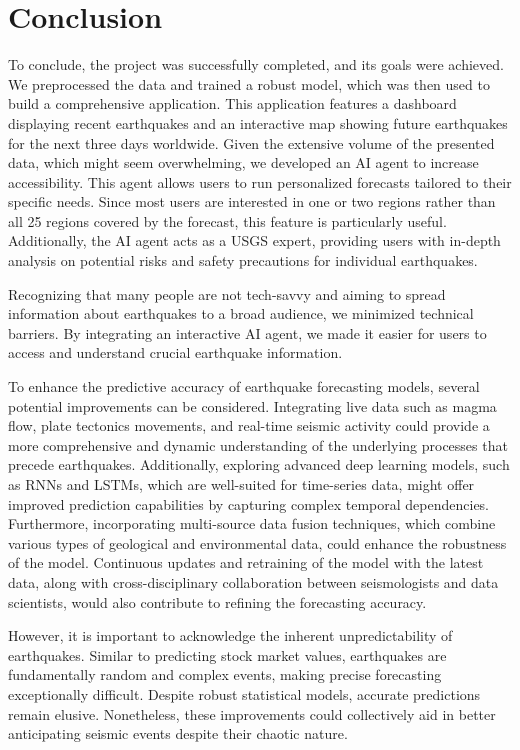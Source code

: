 \chapter{Conclusion}\label{ch:conclusion}
To conclude, the project was successfully completed, and its goals were achieved.
We preprocessed the data and trained a robust model, which was then used to build a
comprehensive application. This application features a dashboard displaying recent
earthquakes and an interactive map showing future earthquakes for the next three days
worldwide. Given the extensive volume of the presented data, which might seem overwhelming,
we developed an AI agent to increase accessibility. This agent allows users to run
personalized forecasts tailored to their specific needs. Since most users are
interested in one or two regions rather than all 25 regions covered by the forecast,
this feature is particularly useful. Additionally, the AI agent acts as a \ac{USGS} expert,
providing users with in-depth analysis on potential risks and safety precautions for individual earthquakes.

Recognizing that many people are not tech-savvy and aiming to spread information
about earthquakes to a broad audience, we minimized technical barriers. By integrating
an interactive AI agent, we made it easier for users to access and understand crucial
earthquake information.

To enhance the predictive accuracy of earthquake forecasting models, several potential
improvements can be considered. Integrating live data such as magma flow, plate tectonics
movements, and real-time seismic activity could provide a more comprehensive and dynamic
understanding of the underlying processes that precede earthquakes. Additionally, exploring
advanced deep learning models, such as \ac{RNNs} and \ac{LSTM}s, which are well-suited for time-series
data, might offer improved prediction capabilities by capturing complex temporal dependencies.
Furthermore, incorporating multi-source data fusion techniques, which combine various types of
geological and environmental data, could enhance the robustness of the model. Continuous
updates and retraining of the model with the latest data, along with cross-disciplinary
collaboration between seismologists and data scientists, would also contribute to refining
the forecasting accuracy.

However, it is important to acknowledge the inherent unpredictability of earthquakes.
Similar to predicting stock market values, earthquakes are fundamentally random and
complex events, making precise forecasting exceptionally difficult. Despite robust
statistical models, accurate predictions remain elusive. Nonetheless, these improvements
could collectively aid in better anticipating seismic events despite their chaotic nature.